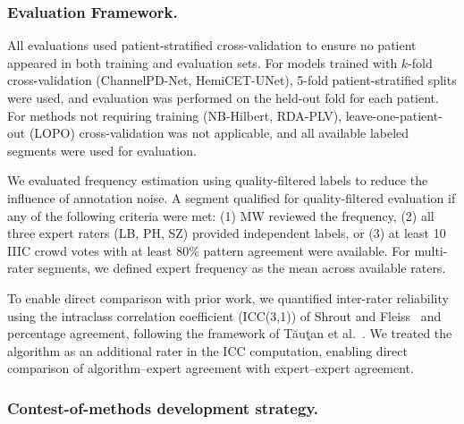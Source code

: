 \documentclass{iopjournal}
\begin{document}
\subsubsection{Evaluation Framework.}

All evaluations used patient-stratified cross-validation to ensure no patient appeared in both training and evaluation sets. For models trained with $k$-fold cross-validation (ChannelPD-Net, HemiCET-UNet), 5-fold patient-stratified splits were used, and evaluation was performed on the held-out fold for each patient. For methods not requiring training (NB-Hilbert, RDA-PLV), leave-one-patient-out (LOPO) cross-validation was not applicable, and all available labeled segments were used for evaluation.

We evaluated frequency estimation using quality-filtered labels to reduce the influence of annotation noise. A segment qualified for quality-filtered evaluation if any of the following criteria were met: (1) MW reviewed the frequency, (2) all three expert raters (LB, PH, SZ) provided independent labels, or (3) at least 10 IIIC crowd votes with at least 80\% pattern agreement were available. For multi-rater segments, we defined expert frequency as the mean across available raters.

To enable direct comparison with prior work, we quantified inter-rater reliability using the intraclass correlation coefficient (ICC(3,1)) of Shrout and Fleiss~\cite{shrout1979} and percentage agreement, following the framework of T\u{a}u\c{t}an et al.~\cite{tautan2025}. We treated the algorithm as an additional rater in the ICC computation, enabling direct comparison of algorithm--expert agreement with expert--expert agreement.

\subsubsection{Contest-of-methods development strategy.}
\label{sec:contest_strategy}
\end{document}
